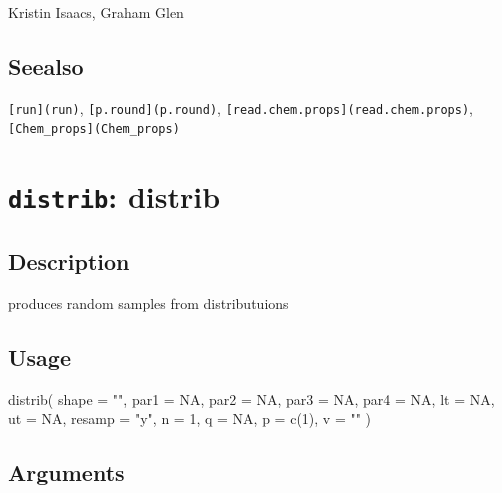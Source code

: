 \documentclass[
]{article}
\newenvironment{Shaded}{\begin{snugshade}}{\end{snugshade}}
\newcommand{\AttributeTok}[1]{\textcolor[rgb]{0.77,0.63,0.00}{#1}}
\newcommand{\ConstantTok}[1]{\textcolor[rgb]{0.00,0.00,0.00}{#1}}
\newcommand{\DecValTok}[1]{\textcolor[rgb]{0.00,0.00,0.81}{#1}}
\newcommand{\FunctionTok}[1]{\textcolor[rgb]{0.00,0.00,0.00}{#1}}
\newcommand{\NormalTok}[1]{#1}
\newcommand{\StringTok}[1]{\textcolor[rgb]{0.31,0.60,0.02}{#1}}
\begin{document}
Kristin Isaacs, Graham Glen

\hypertarget{seealso-9}{%
\subsection{Seealso}\label{seealso-9}}

\texttt{{[}run{]}(run)}, \texttt{{[}p.round{]}(p.round)},
\texttt{{[}read.chem.props{]}(read.chem.props)},
\texttt{{[}Chem\_props{]}(Chem\_props)}

\hypertarget{distrib-distrib}{%
\section{\texorpdfstring{\texttt{distrib}:
distrib}{distrib: distrib}}\label{distrib-distrib}}

\hypertarget{description-17}{%
\subsection{Description}\label{description-17}}

produces random samples from distributuions

\hypertarget{usage-17}{%
\subsection{Usage}\label{usage-17}}

\begin{Shaded}
\begin{Highlighting}[]
\FunctionTok{distrib}\NormalTok{(}
  \AttributeTok{shape =} \StringTok{""}\NormalTok{,}
  \AttributeTok{par1 =} \ConstantTok{NA}\NormalTok{,}
  \AttributeTok{par2 =} \ConstantTok{NA}\NormalTok{,}
  \AttributeTok{par3 =} \ConstantTok{NA}\NormalTok{,}
  \AttributeTok{par4 =} \ConstantTok{NA}\NormalTok{,}
  \AttributeTok{lt =} \ConstantTok{NA}\NormalTok{,}
  \AttributeTok{ut =} \ConstantTok{NA}\NormalTok{,}
  \AttributeTok{resamp =} \StringTok{"y"}\NormalTok{,}
  \AttributeTok{n =} \DecValTok{1}\NormalTok{,}
  \AttributeTok{q =} \ConstantTok{NA}\NormalTok{,}
  \AttributeTok{p =} \FunctionTok{c}\NormalTok{(}\DecValTok{1}\NormalTok{),}
  \AttributeTok{v =} \StringTok{""}
\NormalTok{)}
\end{Highlighting}
\end{Shaded}

\hypertarget{arguments-14}{%
\subsection{Arguments}\label{arguments-14}}
\end{document}
